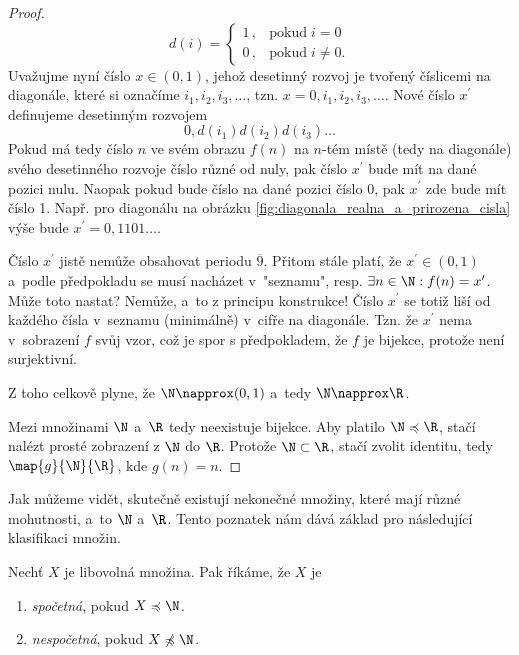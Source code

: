 \begin{proof}
    \begin{equation*}
        d(i)=\left\{
        \begin{array}{ll}
            1\,, & \text{pokud}\;i=0\\
            0\,, & \text{pokud}\;i\neq 0.
        \end{array}
        \right.
    \end{equation*}
    Uvažujme nyní číslo $x\in(0,1)$, jehož desetinný rozvoj je tvořený číslicemi na diagonále, které si označíme $i_1,i_2,i_3,\dots$, tzn. $x=0,i_1,i_2,i_3,\dots$. Nové číslo $x^\prime$ definujeme desetinným rozvojem
    \begin{equation*}
        0,d(i_1)d(i_2)d(i_3)\dots
    \end{equation*}
    Pokud má tedy číslo $n$ ve svém obrazu $f(n)$ na $n$-tém místě (tedy na diagonále) svého desetinného rozvoje číslo různé od nuly, pak číslo $x^\prime$ bude mít na dané pozici nulu. Naopak pokud bude číslo na dané pozici číslo 0, pak $x^\prime$ zde bude mít číslo 1. Např. pro diagonálu na obrázku \ref{fig:diagonala_realna_a_prirozena_cisla} výše bude $x^\prime=0,1101\dots$.\par
    Číslo $x^\prime$ jistě nemůže obsahovat periodu $\overline{9}$. Přitom stále platí, že $x^\prime\in(0,1)$ a~podle předpokladu se musí nacházet v~"seznamu", resp. $\exists n\in\N: f(n)=x^\prime$. Může toto nastat? Nemůže, a~to z principu konstrukce! Číslo $x^\prime$ se totiž liší od každého čísla v~seznamu (minimálně) v~cifře na diagonále. Tzn. že $x^\prime$ nema v~sobrazení $f$ svůj vzor, což je spor s předpokladem, že $f$ je bijekce, protože není surjektivní.\par
    Z toho celkově plyne, že $\N\napprox(0,1)$ a~tedy $\N\napprox\R$.
    \medskip

    Mezi množinami $\N$ a~$\R$ tedy neexistuje bijekce. Aby platilo $\N\preccurlyeq\R$, stačí nalézt prosté zobrazení z $\N$ do $\R$. Protože $\N\subset\R$, stačí zvolit identitu, tedy $\map{g}{\N}{\R}$, kde $g(n)=n$.
\end{proof}
\needspace{1cm}
Jak můžeme vidět, skutečně existují nekonečné množiny, které mají různé mohutnosti, a~to $\N$ a~$\R$.  Tento poznatek nám dává základ pro následující klasifikaci množin.
\begin{definition}\label{def:spocetna_a_nespocetna_mnozina}
    Nechť $X$ je libovolná množina. Pak říkáme, že $X$ je
    \begin{enumerate}[label=(\roman*)]
        \item \emph{spočetná}, pokud $X\preccurlyeq\N$.
        \item \emph{nespočetná}, pokud $X\not\preccurlyeq\N$.
    \end{enumerate}
\end{definition}
